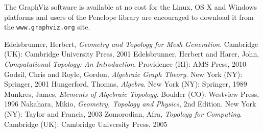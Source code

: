 \documentclass[12pt,letterpaper]{report}
\begin{document}
The GraphViz software is available at no cost for the Linux, OS X and Windows platforms and users of the 
Penelope library are encouraged to download it from the \texttt{www.graphviz.org} site. 
\begin{thebibliography}{99}
 Edelsbrunner, Herbert, \emph{Geometry and Topology for Mesh Generation}. Cambridge (UK): 
Cambridge University Press, 2001
 Edelsbrunner, Herbert and Harer, John, \emph{Computational Topology: An Introduction}. 
Providence (RI): AMS Press, 2010
 Godsil, Chris and Royle, Gordon, \emph{Algebraic Graph Theory}. New York (NY): Springer, 2001
 Hungerford, Thomas, \emph{Algebra}. New York (NY): Springer, 1989
 Munkres, James, \emph{Elements of Algebraic Topology}. Boulder (CO): Westview Press, 1996
 Nakahara, Mikio, \emph{Geometry, Topology and Physics}, 2nd Edition. New York (NY): Taylor and 
Francis, 2003 
 Zomorodian, Afra, \emph{Topology for Computing}. Cambridge (UK): Cambridge University Press, 2005
\end{thebibliography}
\end{document}
